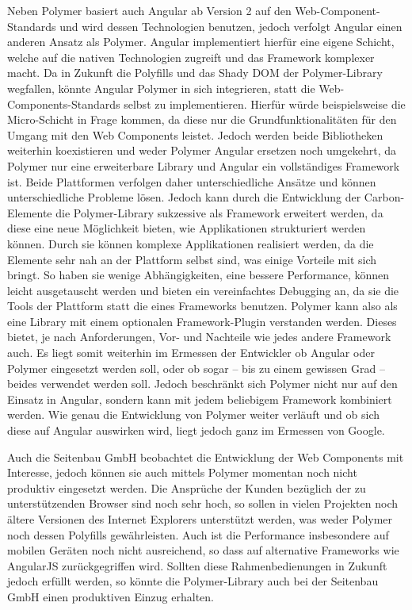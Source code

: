 Neben Polymer basiert auch Angular ab Version 2 auf den Web-Component-Stan\-dards und wird dessen Technologien benutzen, jedoch verfolgt Angular einen anderen Ansatz als Polymer. Angular implementiert hierfür eine eigene Schicht, welche auf die nativen Technologien zugreift und das Framework komplexer macht. Da in Zukunft die Polyfills und das Shady \ac{DOM} der Polymer-Library wegfallen, könnte Angular Polymer in sich integrieren, statt die Web-Components-Standards selbst zu implementieren. Hierfür würde beispielsweise die Micro-Schicht in Frage kommen, da diese nur die Grundfunktionalitäten für den Umgang mit den Web Components leistet. Jedoch werden beide Bibliotheken weiterhin koexistieren und weder Polymer Angular ersetzen noch umgekehrt, da Polymer nur eine erweiterbare Library und Angular ein vollständiges Framework ist. Beide Plattformen verfolgen daher unterschiedliche Ansätze und können unterschiedliche Probleme lösen. Jedoch kann durch die Entwicklung der Carbon-Elemente die Polymer-Library sukzessive als Framework erweitert werden, da diese eine neue Möglichkeit bieten, wie Applikationen strukturiert werden können. Durch sie können komplexe Applikationen realisiert werden, da die Elemente sehr nah an der Plattform selbst sind, was einige Vorteile mit sich bringt. So haben sie wenige Abhängigkeiten, eine bessere Performance, können leicht ausgetauscht werden und bieten ein vereinfachtes Debugging an, da sie die Tools der Plattform statt die eines Frameworks benutzen. Polymer kann also als eine Library mit einem optionalen Framework-Plugin verstanden werden. Dieses bietet, je nach Anforderungen, Vor- und Nachteile wie jedes andere Framework auch. Es liegt somit weiterhin im Ermessen der Entwickler ob Angular oder Polymer eingesetzt werden soll, oder ob sogar -- bis zu einem gewissen Grad -- beides verwendet werden soll. Jedoch beschränkt sich Polymer nicht nur auf den Einsatz in Angular, sondern kann mit jedem beliebigem Framework kombiniert werden. Wie genau die Entwicklung von Polymer weiter verläuft und ob sich diese auf Angular auswirken wird, liegt jedoch ganz im Ermessen von Google.

Auch die Seitenbau GmbH beobachtet die Entwicklung der Web Components mit Interesse, jedoch können sie auch mittels Polymer momentan noch nicht produktiv eingesetzt werden. Die Ansprüche der Kunden bezüglich der zu unterstützenden Browser sind noch sehr hoch, so sollen in vielen Projekten noch ältere Versionen des Internet Explorers unterstützt werden, was weder Polymer noch dessen Polyfills gewährleisten. Auch ist die Performance insbesondere auf mobilen Geräten noch nicht ausreichend, so dass auf alternative Frameworks wie AngularJS zurückgegriffen wird. Sollten diese Rahmenbedienungen in Zukunft jedoch erfüllt werden, so könnte die Polymer-Library auch bei der Seitenbau GmbH einen produktiven Einzug erhalten.
